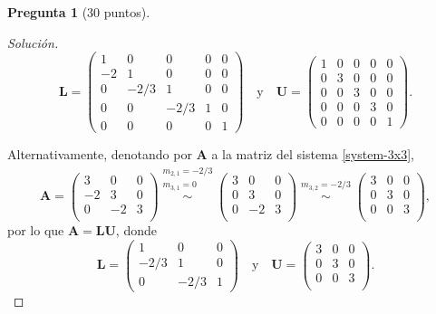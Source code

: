 \documentclass[letterpaper,12pt]{article}
\theoremstyle{definition}
\newtheorem{question}{Pregunta}
\numberwithin{equation}{question}
\newenvironment{solution}{\begin{proof}[Solución]}{\end{proof}}
\begin{document}
\begin{question}[30 puntos]
\begin{solution}
%
\begin{equation*}
\boldsymbol{L} =
\begin{pmatrix}
1 & 0 & 0 & 0 & 0\\
-2 & 1 & 0 & 0 & 0\\
0 & -2/3 & 1 & 0 & 0\\
0 & 0 & -2/3 & 1 & 0\\
0 & 0 & 0 & 0 & 1
\end{pmatrix}
\quad\text{y}\quad
\boldsymbol{U} =
\begin{pmatrix}
1 & 0 & 0 & 0 & 0\\
0 & 3 & 0 & 0 & 0\\
0 & 0 & 3 & 0 & 0\\
0 & 0 & 0 & 3 & 0\\
0 & 0 & 0 & 0 & 1
\end{pmatrix}.
\end{equation*}
%

Alternativamente, denotando por $\boldsymbol{A}$ a la matriz del sistema \eqref{system-3x3},
%
\begin{equation*}
\boldsymbol{A} =
\begin{pmatrix}
3 & 0 & 0\\
-2 & 3 & 0\\
0 & -2 & 3\\
\end{pmatrix}
\stackrel{\substack{m_{2,1} = -2/3\\m_{3,1} = 0}}{\sim}
\begin{pmatrix}
3 & 0 & 0\\
0 & 3 & 0\\
0 & -2 & 3\\
\end{pmatrix}
\stackrel{\substack{m_{3,2} = -2/3}}{\sim}
\begin{pmatrix}
3 & 0 & 0\\
0 & 3 & 0\\
0 & 0 & 3\\
\end{pmatrix},
\end{equation*}
%
por lo que $\boldsymbol{A} = \boldsymbol{L} \boldsymbol{U}$, donde
%
\begin{equation*}
\boldsymbol{L} =
\begin{pmatrix}
1 & 0 & 0\\
-2/3 & 1 & 0\\
0 & -2/3 & 1
\end{pmatrix}
\quad\text{y}\quad
\boldsymbol{U} =
\begin{pmatrix}
3 & 0 & 0\\
0 & 3 & 0\\
0 & 0 & 3\\
\end{pmatrix}.
\end{equation*}


\end{solution}
\end{question}
\end{document}
